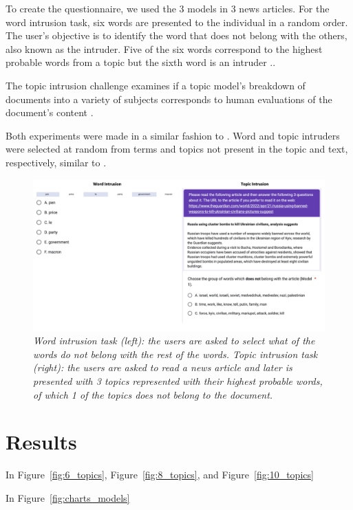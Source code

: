 \documentclass[twoside,12pt,a4paper]{article}
\begin{document}
To create the questionnaire, we used the 3 models in 3 news articles. For the word intrusion task, six words are presented to the individual in a random order.
The user's objective is to identify the word that does not belong with the others, also known as the intruder. Five of the six words correspond to the highest probable words from a topic but the sixth word is an intruder \citep{nikolenko_topic_2017}..

The topic intrusion challenge examines if a topic model's breakdown of documents into a variety of subjects corresponds to human evaluations of the document's content \citep{nikolenko_topic_2017}. 

Both experiments were made in a similar fashion to \citep{nikolenko_topic_2017, chang_reading_nodate}. Word and topic intruders were selected at random from terms and topics not present in the topic and text, respectively, similar to \citep{nikolenko_topic_2017}.

\begin{figure}[h]
\centering
\includegraphics[scale=0.4]{forms_results.png}
\caption{\textit{Word intrusion task (left): the users are asked to select what of the words do not belong with the rest of the words. Topic intrusion task (right): the users are asked to read a news article and later is presented with 3 topics represented with their highest probable words, of which 1 of the topics does not belong to the document.}}
\label{fig:forms_results}
\end{figure}

\clearpage
\section{Results}
In Figure~\ref{fig:6_topics}, Figure~\ref{fig:8_topics}, and Figure~\ref{fig:10_topics}

In Figure~\ref{fig:charts_models}
\end{document}
